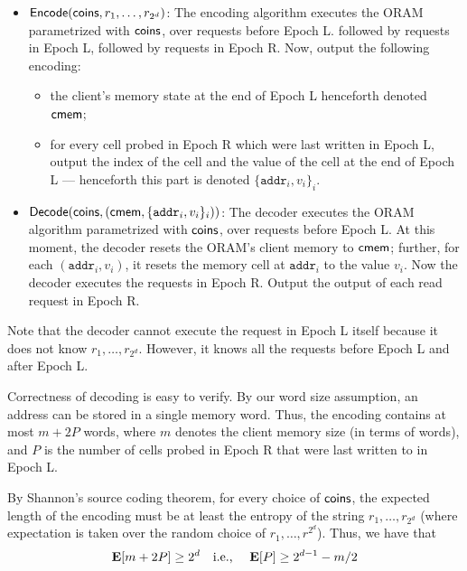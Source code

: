 \begin{itemize}[leftmargin=6mm]
\item  ${\sf Encode}({\sf coins}, r_1, \ldots, r_{2^d})$:
The encoding algorithm executes the ORAM parametrized
with ${\sf coins}$, over requests before Epoch L.
followed by requests in Epoch L, 
followed by requests in Epoch R.
Now, output the following encoding:
\begin{itemize}
\item 
the client's memory state at the end of Epoch L henceforth denoted
${\sf cmem}$; 
\item 
for every cell probed 
in Epoch R which were 
last written in Epoch L, output
the index of the cell and 
the value of the cell at the end of Epoch L --- henceforth
this part is denoted $\{\texttt{addr}_i, v_i\}_i$.
\end{itemize}


\item  ${\sf Decode}({\sf coins}, ({\sf cmem}, \{\texttt{addr}_i, v_i\}_i))$:
The decoder executes the ORAM algorithm 
parametrized with ${\sf coins}$, over requests before Epoch L.
At this moment, 
the decoder resets the ORAM's client memory to ${\sf cmem}$;  
further, 
for each $(\texttt{addr}_i, v_i)$, it resets
the memory cell at $\texttt{addr}_i$ to the value $v_i$.
Now the decoder executes the requests in Epoch R.
Output the output of each read request in
Epoch R.
\end{itemize}

Note that the decoder cannot execute the request in Epoch L
itself because it does not know $r_1, \ldots, r_{2^d}$.
However, it knows all the requests before Epoch L and after Epoch L. 


Correctness of decoding is easy to verify. 
By our word size
 assumption, an address can be stored in a single memory word.
Thus, the encoding contains at most  
$m + 2 P$
words, where 
$m$
denotes the client memory size (in terms of words), and 
$P$ is the number 
of cells probed in Epoch R that were 
last written to in Epoch L.

By Shannon's source coding theorem, for every choice
of ${\sf coins}$, the expected length of the encoding 
must be at least the entropy
of the string $r_1, \ldots, r_{2^d}$ (where expectation
is taken over the random choice of $r_1, \ldots, r^{2^d}$). 
Thus, we have that 
\[
{\bf E}[m + 2 P] \geq 2^d \quad \text{i.e., }
\quad {\bf E}[P] \geq 2^{d-1}-m/2
\]

